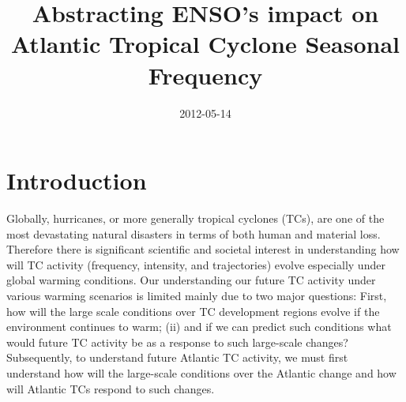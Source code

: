 \documentclass[]{article}
\title{Abstracting ENSO's impact on Atlantic Tropical Cyclone Seasonal Frequency}
\author{  }
\date{2012-05-14}
\begin{document}
\ifpdf
{}
\else
{}
\fi

\maketitle


\begin{abstract}
\end{abstract}

\section{Introduction}
Globally, hurricanes, or more generally tropical cyclones (TCs), are one of the most devastating natural disasters in terms of both human and material loss. Therefore there is significant scientific and societal interest in understanding how will TC activity (frequency, intensity, and trajectories) evolve especially under global warming conditions. Our understanding our future TC activity under various warming scenarios is limited \cite{knutson2010} mainly due to two major questions: First, how will the large scale conditions over TC development regions evolve if the environment continues to warm; (ii) and if we can predict such conditions what would future TC activity be as a response to such large-scale changes? Subsequently, to understand future Atlantic TC activity, we must first understand how will the large-scale conditions over the Atlantic change and how will Atlantic TCs respond to such changes.
\end{document}

